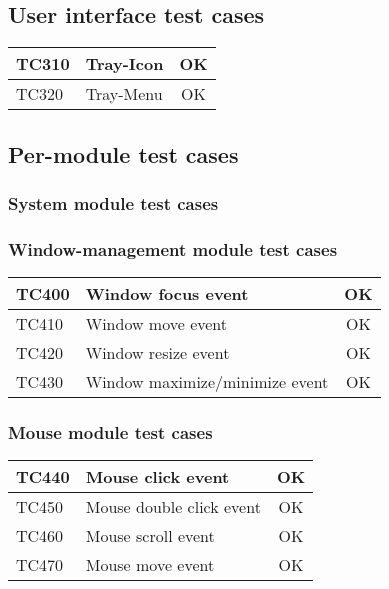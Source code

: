 \subsection{User interface test cases}

\begin{tabular}{|l|l|c|}
    \hline
    TC310 & Tray-Icon & \cellcolor{green!25}OK \\ \hline
    TC320 & Tray-Menu & \cellcolor{green!25}OK \\ \hline
\end{tabular}

\subsection{Per-module test cases}

\subsubsection{System module test cases}

\subsubsection*{Window-management module test cases}

\begin{tabular}{|l|l|c|}
    \hline
    TC400 & Window focus event & \cellcolor{green!25}OK \\ \hline
    TC410 & Window move event & \cellcolor{green!25}OK \\ \hline
    TC420 & Window resize event & \cellcolor{green!25}OK \\ \hline
    TC430 & Window maximize/minimize event & \cellcolor{green!25}OK \\ \hline
\end{tabular}

\subsubsection*{Mouse module test cases}

\begin{tabular}{|l|l|c|}
    \hline
    TC440 & Mouse click event & \cellcolor{green!25}OK \\ \hline
    TC450 & Mouse double click event & \cellcolor{green!25}OK \\ \hline
    TC460 & Mouse scroll event & \cellcolor{green!25}OK \\ \hline
    TC470 & Mouse move event & \cellcolor{green!25}OK \\ \hline
\end{tabular}

